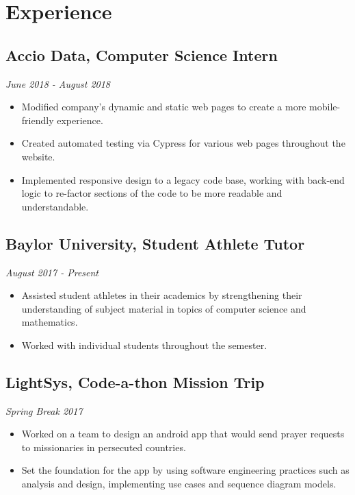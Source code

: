 \documentclass{article}
\begin{document}
\section{Experience}

\subsection{Accio Data, Computer Science Intern}
\hfill\textit{June 2018 - August 2018}

\begin{itemize}
	\itemsep0em
	\item Modified company's dynamic and static web pages to create a more
	mobile-friendly experience.
	\item Created automated testing via Cypress for various web pages
	throughout the website.
	\item Implemented responsive design to a legacy code base, working with
	back-end logic to re-factor sections of the code to be more
	readable and understandable.  
\end{itemize}

\subsection{Baylor University, Student Athlete Tutor} 
\hfill\textit{August 2017 - Present}

\begin{itemize}
	\itemsep0em
	\item Assisted student athletes in their academics by strengthening their understanding of subject material in topics of computer science and mathematics.
	
	\item Worked with individual students throughout the semester. 
\end{itemize}

\subsection{LightSys, Code-a-thon Mission Trip}
\hfill
\textit{Spring Break 2017}

\begin{itemize}
	\itemsep0em
	\item Worked on a team to design an android app that would send prayer requests
	to missionaries in persecuted countries. 

	\item Set the foundation for the app by using software engineering practices such as analysis and design, implementing use cases and sequence diagram models.
\end{itemize}
  
\end{document}
